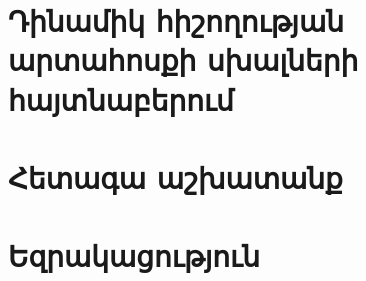 \documentclass[a4paper, 12pt]{report}
\begin{document}
    \section{Դինամիկ հիշողության արտահոսքի սխալների հայտնաբերում}\label{sec:bugDetection}
    

    \section{Հետագա աշխատանք}\label{sec:furtherWork}
    

    \clearpage
    \section*{Եզրակացություն}\label{sec:conclusion}
    

    \clearpage
    
    
\end{document}
